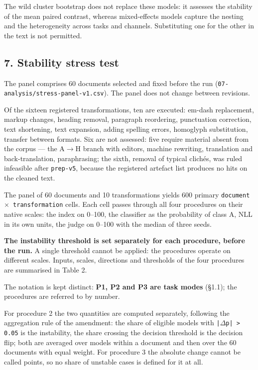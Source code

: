 \documentclass[11pt,a4paper]{article}
\renewcommand{\_}{\textunderscore\allowbreak}
\begin{document}
The wild cluster bootstrap does not replace these models: it assesses the
stability of the mean paired contrast, whereas mixed-effects models capture the
nesting and the heterogeneity across tasks and channels. Substituting one for the
other in the text is not permitted.

\subsection{7. Stability stress test}

The panel comprises 60 documents selected and fixed before the run
(\texttt{07-\allowbreak{}analysis/stress-\allowbreak{}panel-\allowbreak{}v1.csv}). The panel does not change between revisions.

Of the sixteen registered transformations, ten are executed: em-dash replacement,
markup changes, heading removal, paragraph reordering, punctuation correction,
text shortening, text expansion, adding spelling errors, homoglyph substitution,
transfer between formats. Six are not assessed: five require material absent from
the corpus — the A$\to$H branch with editors, machine rewriting, translation and
back-translation, paraphrasing; the sixth, removal of typical clich\'es, was ruled
infeasible after \texttt{prep-\allowbreak{}v5}, because the registered artefact list produces no hits
on the cleaned text.

The panel of 60 documents and 10 transformations yields 600 primary
\texttt{document $\times$ transformation} cells. Each cell passes through all four procedures on
their native scales: the index on 0–100, the classifier as the probability of
class A, NLL in its own units, the judge on 0–100 with the median of three
seeds.

\textbf{The instability threshold is set separately for each procedure, before the run.}
A single threshold cannot be applied: the procedures operate on different scales.
Inputs, scales, directions and thresholds of the four procedures are summarised in
Table 2.

The notation is kept distinct: \textbf{P1, P2 and P3 are task modes} (§1.1); the
procedures are referred to by number.

\setcounter{table}{1}


For procedure 2 the two quantities are computed separately, following the
aggregation rule of the amendment: the share of eligible models with
\texttt{|$\Delta$p| > 0.05} is the instability, the share crossing the decision threshold is
the decision flip; both are averaged over models within a document and then over
the 60 documents with equal weight. For procedure 3 the absolute change cannot be
called points, so no share of unstable cases is defined for it at all.
\end{document}
